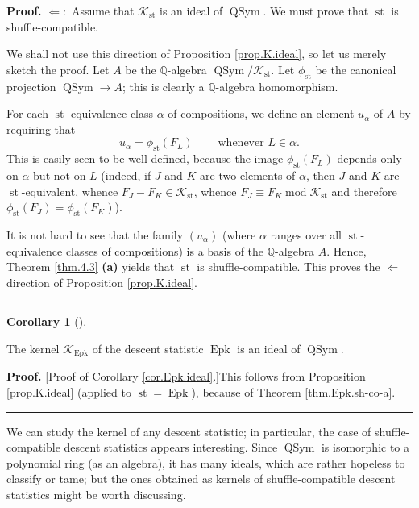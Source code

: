 \documentclass[numbers=enddot,12pt,final,onecolumn,notitlepage]{scrartcl}%
\theoremstyle{definition}
\newtheorem{coro}[theo]{Corollary}
\newenvironment{corollary}[1][]
{\begin{coro}[#1]\begin{leftbar}}
{\end{leftbar}\end{coro}}
\newenvironment{proof}[1][Proof]{\noindent\textbf{#1.} }{\ \rule{0.5em}{0.5em}}
\begin{document}
\begin{proof}
$\Longleftarrow:$ Assume that $\mathcal{K}_{\operatorname*{st}}$ is an ideal
of $\operatorname*{QSym}$. We must prove that $\operatorname*{st}$ is shuffle-compatible.

We shall not use this direction of Proposition \ref{prop.K.ideal}, so let us
merely sketch the proof. Let $A$ be the $\mathbb{Q}$-algebra
$\operatorname*{QSym}/\mathcal{K}_{\operatorname*{st}}$. Let $\phi
_{\operatorname*{st}}$ be the canonical projection $\operatorname*{QSym}%
\rightarrow A$; this is clearly a $\mathbb{Q}$-algebra homomorphism.

For each $\operatorname*{st}$-equivalence class $\alpha$ of compositions, we
define an element $u_{\alpha}$ of $A$ by requiring that%
\[
u_{\alpha}=\phi_{\operatorname*{st}}\left(  F_{L}\right)
\ \ \ \ \ \ \ \ \ \ \text{whenever }L\in\alpha.
\]
This is easily seen to be well-defined, because the image $\phi
_{\operatorname*{st}}\left(  F_{L}\right)  $ depends only on $\alpha$ but not
on $L$ (indeed, if $J$ and $K$ are two elements of $\alpha$, then $J$ and $K$
are $\operatorname*{st}$-equivalent, whence $F_{J}-F_{K}\in\mathcal{K}%
_{\operatorname*{st}}$, whence $F_{J}\equiv F_{K}\operatorname{mod}%
\mathcal{K}_{\operatorname*{st}}$ and therefore $\phi_{\operatorname*{st}%
}\left(  F_{J}\right)  =\phi_{\operatorname*{st}}\left(  F_{K}\right)  $).

It is not hard to see that the family $\left(  u_{\alpha}\right)  $ (where
$\alpha$ ranges over all $\operatorname*{st}$-equivalence classes of
compositions) is a basis of the $\mathbb{Q}$-algebra $A$. Hence, Theorem
\ref{thm.4.3} \textbf{(a)} yields that $\operatorname*{st}$ is
shuffle-compatible. This proves the $\Longleftarrow$ direction of Proposition
\ref{prop.K.ideal}.
\end{proof}

\begin{corollary}
\label{cor.Epk.ideal}The kernel $\mathcal{K}_{\operatorname*{Epk}}$ of the
descent statistic $\operatorname*{Epk}$ is an ideal of $\operatorname*{QSym}$.
\end{corollary}

\begin{proof}
[Proof of Corollary \ref{cor.Epk.ideal}.]This follows from Proposition
\ref{prop.K.ideal} (applied to $\operatorname*{st}=\operatorname*{Epk}$),
because of Theorem \ref{thm.Epk.sh-co-a}.
\end{proof}

We can study the kernel of any descent statistic; in particular, the case of
shuffle-compatible descent statistics appears interesting. Since
$\operatorname*{QSym}$ is isomorphic to a polynomial ring (as an algebra), it
has many ideals, which are rather hopeless to classify or tame; but the ones
obtained as kernels of shuffle-compatible descent statistics might be worth discussing.
\end{document}
